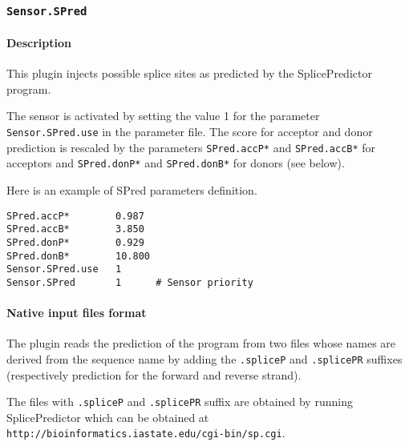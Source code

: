 
\subsubsection{\texttt{Sensor.SPred}}

\paragraph{Description}

This plugin injects possible splice sites as predicted by the
SplicePredictor program. 

The sensor is activated by setting the value 1 for the parameter
\texttt{Sensor.SPred.use} in the parameter file. The score for acceptor
and donor prediction is rescaled by the parameters {\tt SPred.accP*} and
{\tt SPred.accB*} for acceptors and {\tt SPred.donP*} and {\tt SPred.donB*} for
donors (see below).

Here is an example of SPred parameters definition.
\begin{Verbatim}[fontsize=\small]
SPred.accP*        0.987
SPred.accB*        3.850
SPred.donP*        0.929
SPred.donB*        10.800
Sensor.SPred.use   1
Sensor.SPred       1      # Sensor priority
\end{Verbatim}

\paragraph{Native input files format}
The plugin reads the prediction of
the program from two files whose names are derived from the sequence
name by adding the \texttt{.spliceP} and \texttt{.splicePR} suffixes
(respectively prediction for the forward and reverse strand).

The files with \texttt{.spliceP} and \texttt{.splicePR} suffix are
obtained by running SplicePredictor which can be obtained at
\texttt{http://bioinformatics.iastate.edu/cgi-bin/sp.cgi}.

